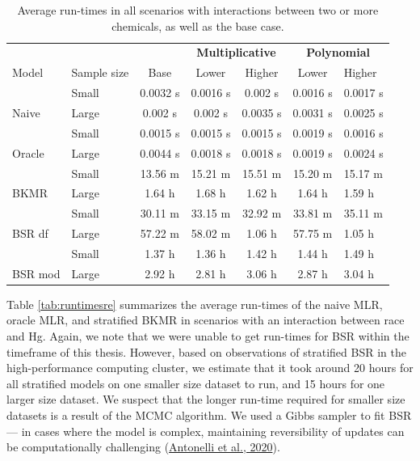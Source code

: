 \documentclass[12pt, twoside]{amherstthesis}
\begin{document}
\begin{table}

\caption{\label{tab:runtimes}Average run-times in all scenarios with interactions between two or more chemicals, as well as the base case.}
\centering
\begin{tabular}[t]{llccccl}
\toprule
\multicolumn{3}{c}{\textbf{ }} & \multicolumn{2}{c}{\textbf{Multiplicative}} & \multicolumn{2}{c}{\textbf{Polynomial}} \\
\cmidrule(l{3pt}r{3pt}){4-5} \cmidrule(l{3pt}r{3pt}){6-7}
Model & Sample size & Base & Lower & Higher & Lower & Higher\\
\midrule
 & Small & 0.0032 s & 0.0016 s & 0.002 s & 0.0016 s & 0.0017 s\\

\multirow{-2}{*}{\raggedright\arraybackslash Naive} & Large & 0.002 s & 0.002 s & 0.0035 s & 0.0031 s & 0.0025 s\\
\addlinespace
 & Small & 0.0015 s & 0.0015 s & 0.0015 s & 0.0019 s & 0.0016 s\\

\multirow{-2}{*}{\raggedright\arraybackslash Oracle} & Large & 0.0044 s & 0.0018 s & 0.0018 s & 0.0019 s & 0.0024 s\\
\addlinespace
 & Small & 13.56 m & 15.21 m & 15.51 m & 15.20 m & 15.17 m\\

\multirow{-2}{*}{\raggedright\arraybackslash BKMR} & Large & 1.64 h & 1.68 h & 1.62 h & 1.64 h & 1.59 h\\
\addlinespace
 & Small & 30.11 m & 33.15 m & 32.92 m & 33.81 m & 35.11 m\\

\multirow{-2}{*}{\raggedright\arraybackslash BSR df} & Large & 57.22 m & 58.02 m & 1.06 h & 57.75 m & 1.05 h\\
\addlinespace
 & Small & 1.37 h & 1.36 h & 1.42 h & 1.44 h & 1.49 h\\

\multirow{-2}{*}{\raggedright\arraybackslash BSR mod} & Large & 2.92 h & 2.81 h & 3.06 h & 2.87 h & 3.04 h\\
\bottomrule
\end{tabular}
\end{table}
Table \ref{tab:runtimesre} summarizes the average run-times of the naive MLR, oracle MLR, and stratified BKMR in scenarios with an interaction between race and Hg. Again, we note that we were unable to get run-times for BSR within the timeframe of this thesis. However, based on observations of stratified BSR in the high-performance computing cluster, we estimate that it took around 20 hours for all stratified models on one smaller size dataset to run, and 15 hours for one larger size dataset. We suspect that the longer run-time required for smaller size datasets is a result of the MCMC algorithm. We used a Gibbs sampler to fit BSR --- in cases where the model is complex, maintaining reversibility of updates can be computationally challenging (\protect\hyperlink{ref-antonelli_estimating_2020}{Antonelli et al., 2020}).
\end{document}
